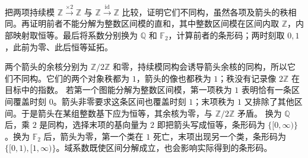 \begin{exercise}\label{g2:ex:persistence-integer-obstruction}
	把两项持续模 \(\mathbb Z\xrightarrow{\times2}\mathbb Z\) 与 \(\mathbb Z\xrightarrow{\mathrm{id}}\mathbb Z\) 比较，证明它们不同构，虽然各项及箭头的秩相同。再证明前者不能分解为整数区间模的直和，其中整数区间模在区间内取 \(\mathbb Z\)，内部映射取恒等。最后将系数分别换为 \(\mathbb Q\) 和 \(\mathbb F_2\)，计算前者的条形码；两时刻取 \(0,1\)，此前为零、此后恒等延拓。
\end{exercise}
\begin{solution}
	两个箭头的余核分别为 \(\mathbb Z/2\mathbb Z\) 和零，持续模同构会诱导箭头余核的同构，所以它们不同构。它们的两个对象秩都为 \(1\)，箭头的像也都秩为 \(1\)；秩没有记录像 \(2\mathbb Z\) 在目标中的指数。
	\ProseParagraphBreak
	若第一个图能分解为整数区间模，第一项秩为 \(1\) 表明恰有一条区间覆盖时刻 \(0\)。箭头非零要求这条区间也覆盖时刻 \(1\)；末项秩为 \(1\) 又排除了其他区间。于是箭头在某组整数基下应为恒等，其余核为零，与 \(\mathbb Z/2\mathbb Z\) 矛盾。
	\ProseParagraphBreak
	换为 \(\mathbb Q\) 后，乘 \(2\) 是同构，选择末项的基向量为 \(2\) 即把箭头写成恒等，条形码为 \(\{[0,\infty)\}\)。换为 \(\mathbb F_2\) 后，箭头为零，第一个类在 \(1\) 死亡，末项出现另一个类，条形码为 \(\{[0,1),[1,\infty)\}\)。域系数既使区间分解成立，也会影响实际得到的条形码。
\end{solution}
